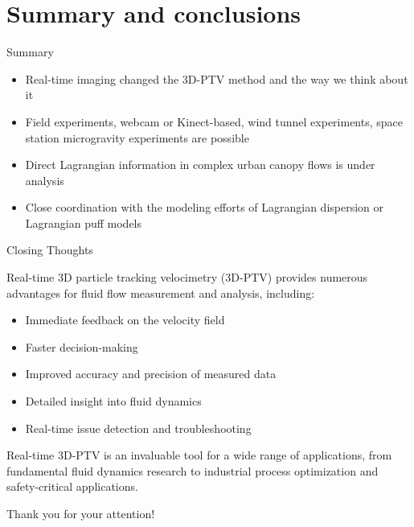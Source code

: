 \documentclass[aspectratio=43]{beamer}
\begin{document}
\section{Summary and conclusions}\label{sec:summary}

\begin{frame}{Summary}
\begin{itemize}
\item Real-time imaging changed the 3D-PTV method and the way we think about it
\item Field experiments, webcam or Kinect-based, wind tunnel experiments, space station microgravity experiments are possible
\item Direct Lagrangian information in complex urban canopy flows is under analysis
\item Close coordination with the modeling efforts of Lagrangian dispersion or Lagrangian puff models
\end{itemize}
\end{frame}



\begin{frame}{Closing Thoughts}

Real-time 3D particle tracking velocimetry (3D-PTV) provides numerous advantages for fluid flow measurement and analysis, including:

\begin{itemize}
\item Immediate feedback on the velocity field
\item Faster decision-making
\item Improved accuracy and precision of measured data
\item Detailed insight into fluid dynamics
\item Real-time issue detection and troubleshooting
\end{itemize}

Real-time 3D-PTV is an invaluable tool for a wide range of applications, from fundamental fluid dynamics research to industrial process optimization and safety-critical applications.

\bigskip
Thank you for your attention!

\end{frame}

\end{document}
